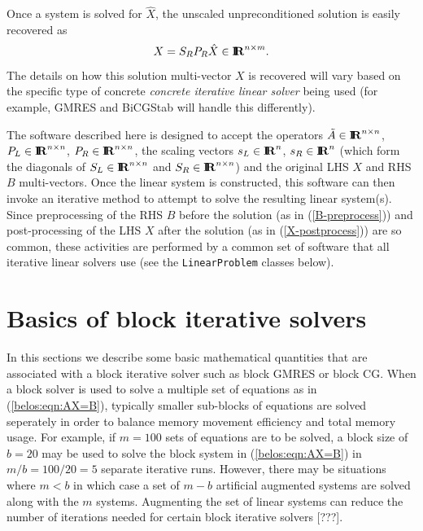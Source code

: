 \documentclass[pdf,ps2pdf,11pt]{SANDreport}
\begin{document}
Once a system is solved for $\hat{X}$, the unscaled unpreconditioned
solution is easily recovered as
%
\begin{equation}
X = S_R P_R \hat{X} \in \mbox{\textbf{I}}\hspace{-0.6ex}\mbox{\textbf{R}}^{n \times m}.
\label{X-postprocess}
\end{equation}
%
{}\noindent{}The details on how this solution multi-vector $X$ is
recovered will vary based on the specific type of concrete
{}\textit{concrete iterative linear solver} being used (for example,
GMRES and BiCGStab will handle this differently).

The software described here is designed to accept the operators
$\tilde{A}\in\mbox{\textbf{I}}\hspace{-0.6ex}\mbox{\textbf{R}}^{n \times n}$, $P_L\in\mbox{\textbf{I}}\hspace{-0.6ex}\mbox{\textbf{R}}^{n \times n}$,
$P_R\in\mbox{\textbf{I}}\hspace{-0.6ex}\mbox{\textbf{R}}^{n \times n}$, the scaling vectors $s_L\in\mbox{\textbf{I}}\hspace{-0.6ex}\mbox{\textbf{R}}^{n}$,
$s_R\in\mbox{\textbf{I}}\hspace{-0.6ex}\mbox{\textbf{R}}^{n}$ (which form the diagonals of $S_L\in\mbox{\textbf{I}}\hspace{-0.6ex}\mbox{\textbf{R}}^{n
\times n}$ and $S_R\in\mbox{\textbf{I}}\hspace{-0.6ex}\mbox{\textbf{R}}^{n \times n}$) and the original
LHS $X$ and RHS $B$ multi-vectors.  Once the linear system is
constructed, this software can then invoke an iterative method to
attempt to solve the resulting linear system(s).  Since preprocessing
of the RHS $B$ before the solution (as in (\ref{B-preprocess})) and
post-processing of the LHS $X$ after the solution (as in
(\ref{X-postprocess})) are so common, these activities are performed
by a common set of software that all iterative linear solvers use (see
the {}\texttt{Linear\-Problem} classes below).

%
\section{Basics of block iterative solvers}
\label{sec:basic-block-solves}
%

In this sections we describe some basic mathematical quantities that
are associated with a block iterative solver such as block GMRES or
block CG.  When a block solver is used to solve a multiple set of
equations as in (\ref{belos:eqn:AX=B}), typically smaller sub-blocks
of equations are solved seperately in order to balance memory movement
efficiency and total memory usage.  For example, if $m=100$ sets of
equations are to be solved, a block size of $b=20$ may be used to
solve the block system in (\ref{belos:eqn:AX=B}) in $m/b = 100/20 = 5$
separate iterative runs.  However, there may be situations where $m <
b$ in which case a set of $m-b$ artificial augmented systems are
solved along with the $m$ systems.  Augmenting the set of linear
systems can reduce the number of iterations needed for certain block
iterative solvers [???].
\end{document}
